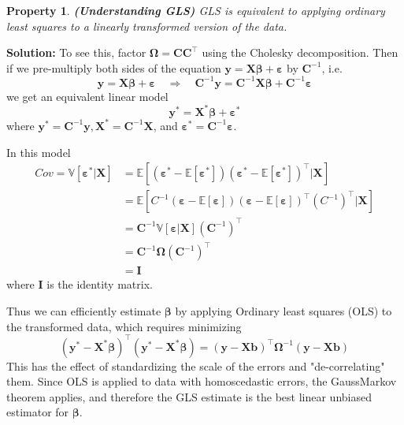 \documentclass[13pt]{article}
\newtheorem{property}[theorem]{Property}
\theoremstyle{definition}
\newenvironment{solution}
{\color{C2}\begin{framed}\begingroup\textbf{Solution:} }
  {\endgroup\end{framed}}
\theoremstyle{remark}
\begin{document}
\begin{property}
    \textbf{(Understanding GLS)} GLS is equivalent to applying ordinary least squares to a linearly transformed version of the data.
\end{property} 
\begin{solution}
    To see this, factor $\mathbf{\Omega}=\mathbf{C C}^{\top}$ using the Cholesky decomposition. Then if we pre-multiply both sides of the equation $\bm{y}=\mathbf{X} \bm{\beta}+\bm{\varepsilon}$ by $\mathbf{C}^{-1}$, i.e.
    \[
    \bm{y}=\mathbf{X} \bm{\beta}+\bm{\varepsilon} \quad \Longrightarrow \quad \mathbf{C}^{-1}\bm{y}=\mathbf{C}^{-1}\mathbf{X} \bm{\beta}+\mathbf{C}^{-1}\bm{\varepsilon}
    \]
    we get an equivalent linear model \[\bm{y}^*=\mathbf{X}^* \bm{\beta}+\bm{\varepsilon}^*\]
    where $\bm{y}^*=\mathbf{C}^{-1} \bm{y}, \mathbf{X}^*=\mathbf{C}^{-1} \mathbf{X}$, and $\bm{\varepsilon}^*=\mathbf{C}^{-1} \bm{\varepsilon}$. 
    
    In this model \begin{align*}Cov=\mathbb{V}\left[\bm{\varepsilon}^* | \mathbf{X}\right]&=\mathbb{E}\left[(\bm{\varepsilon}^*-\mathbb{E}[\bm{\varepsilon}^*])(\bm{\varepsilon}^*-\mathbb{E}[\bm{\varepsilon}^*])^\top | \mathbf{X}\right]\\
    &=\mathbb{E}\left[C^{-1}(\bm{\varepsilon}-\mathbb{E}[\bm{\varepsilon}])(\bm{\varepsilon}-\mathbb{E}[\bm{\varepsilon}])^\top (C^{-1})^\top| \mathbf{X}\right]\\
    &=\mathbf{C}^{-1} \mathbb{V}[\bm{\varepsilon}| \mathbf{X}]\left(\mathbf{C}^{-1}\right)^{\top}\\
    &=\mathbf{C}^{-1} \mathbf{\Omega}\left(\mathbf{C}^{-1}\right)^{\top}\\
    &=\mathbf{I}
    \end{align*}
    where $\mathbf{I}$ is the identity matrix. 
    
    Thus we can efficiently estimate $\bm{\beta}$ by applying Ordinary least squares (OLS) to the transformed data, which requires minimizing
$$
\left(\bm{y}^*-\mathbf{X}^* \bm{\beta}\right)^{\top}\left(\bm{y}^*-\mathbf{X}^* \bm{\beta}\right)=(\bm{y}-\mathbf{X b})^{\top} \mathbf{\Omega}^{-1}(\bm{y}-\mathbf{X} \mathbf{b})
$$
This has the effect of standardizing the scale of the errors and "de-correlating" them. Since OLS is applied to data with homoscedastic errors, the GaussMarkov theorem applies, and therefore the GLS estimate is the best linear unbiased estimator for $\bm{\beta}$.
\end{solution}
\end{document}
